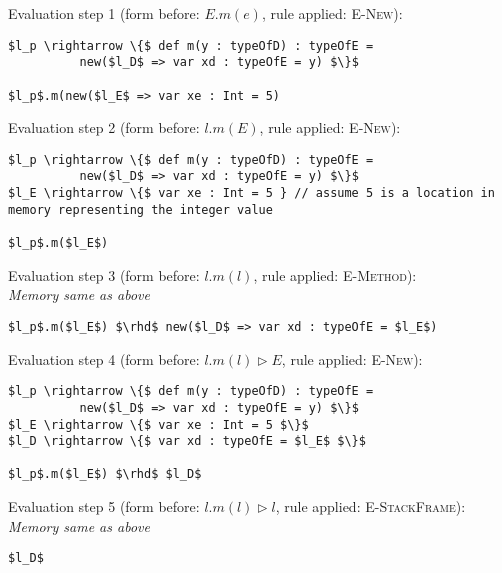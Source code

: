 \documentclass{llncs}
\begin{document}
\vspace{12pt}
\noindent Evaluation step 1 (form before: $E.m(e)$, rule applied: \textsc{E-New}):
\vspace{-6pt}
\begin{lstlisting}[xleftmargin=20pt]
$l_p \rightarrow \{$ def m(y : typeOfD) : typeOfE =
          new($l_D$ => var xd : typeOfE = y) $\}$

$l_p$.m(new($l_E$ => var xe : Int = 5)
\end{lstlisting}

\vspace{12pt}
\noindent Evaluation step 2 (form before: $l.m(E)$, rule applied: \textsc{E-New}):
\vspace{-6pt}
\begin{lstlisting}[xleftmargin=20pt]
$l_p \rightarrow \{$ def m(y : typeOfD) : typeOfE =
          new($l_D$ => var xd : typeOfE = y) $\}$
$l_E \rightarrow \{$ var xe : Int = 5 } // assume 5 is a location in memory representing the integer value

$l_p$.m($l_E$)
\end{lstlisting}

\vspace{12pt}
\noindent Evaluation step 3 (form before: $l.m(l)$, rule applied: \textsc{E-Method}):\\
\vspace{-6pt}
\indent\textit{Memory same as above}\\
\vspace{-6pt}
\begin{lstlisting}[xleftmargin=20pt]
$l_p$.m($l_E$) $\rhd$ new($l_D$ => var xd : typeOfE = $l_E$)
\end{lstlisting}

\vspace{12pt}
\noindent Evaluation step 4 (form before: $l.m(l) \rhd E$, rule applied: \textsc{E-New}):
\vspace{-6pt}
\begin{lstlisting}[xleftmargin=20pt]
$l_p \rightarrow \{$ def m(y : typeOfD) : typeOfE =
          new($l_D$ => var xd : typeOfE = y) $\}$
$l_E \rightarrow \{$ var xe : Int = 5 $\}$
$l_D \rightarrow \{$ var xd : typeOfE = $l_E$ $\}$

$l_p$.m($l_E$) $\rhd$ $l_D$
\end{lstlisting}

\vspace{12pt}
\noindent Evaluation step 5 (form before: $l.m(l) \rhd l$, rule applied: \textsc{E-StackFrame}):\\
\vspace{-6pt}
\indent\textit{Memory same as above}\\
\vspace{-6pt}
\begin{lstlisting}[xleftmargin=20pt]
$l_D$
\end{lstlisting}
\end{document}
